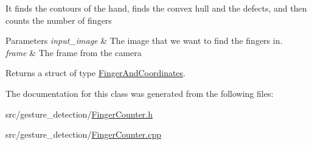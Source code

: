 It finds the contours of the hand, finds the convex hull and the defects, and then counts the number of fingers


\begin{DoxyParams}{Parameters}
{\em input\+\_\+image} & The image that we want to find the fingers in. \\
\hline
{\em frame} & The frame from the camera\\
\hline
\end{DoxyParams}
\begin{DoxyReturn}{Returns}
a struct of type \hyperlink{classFingerAndCoordinates}{Finger\+And\+Coordinates}. 
\end{DoxyReturn}


The documentation for this class was generated from the following files\+:\begin{DoxyCompactItemize}
\item 
src/gesture\+\_\+detection/\hyperlink{FingerCounter_8h}{Finger\+Counter.\+h}\item 
src/gesture\+\_\+detection/\hyperlink{FingerCounter_8cpp}{Finger\+Counter.\+cpp}\end{DoxyCompactItemize}
